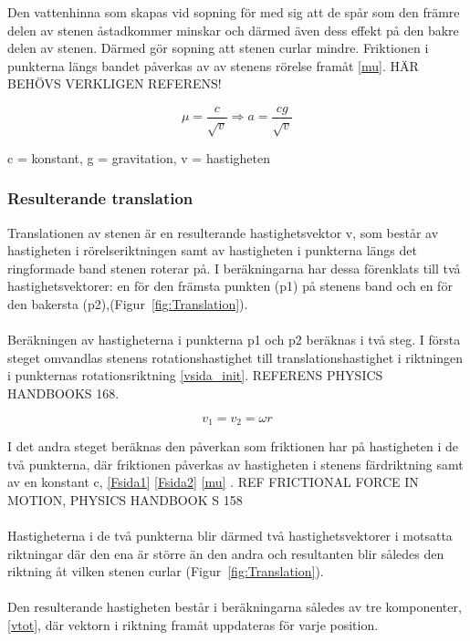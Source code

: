 \documentclass[11pt]{article} %
\begin{document}
Den vattenhinna som skapas vid sopning för med sig att de spår som den främre delen av stenen åstadkommer minskar och därmed  även dess effekt på den bakre delen av stenen. Därmed gör sopning att stenen curlar mindre. Friktionen i punkterna längs bandet påverkas av av stenens rörelse framåt \eqref{mu}. HÄR BEHÖVS VERKLIGEN REFERENS!     

\begin{equation}\label{mu} 
\mu = \frac{c}{\sqrt{v}} \Rightarrow a = \frac{cg}{\sqrt{v}} 
\end{equation}

c = konstant, g = gravitation, v = hastigheten

\subsubsection{Resulterande translation}

Translationen av stenen är en resulterande hastighetsvektor v, som består av hastigheten i rörelseriktningen samt av hastigheten i punkterna längs det ringformade band stenen roterar på. I beräkningarna har dessa förenklats till två hastighetsvektorer: en för den främsta punkten (p1)  på stenens band och en för den bakersta (p2),(Figur~\ref{fig:Translation}). 
\\\\Beräkningen av hastigheterna i punkterna p1 och p2 beräknas i två steg. I första steget omvandlas stenens rotationshastighet till translationshastighet i riktningen i punkternas rotationsriktning \eqref{vsida_init}. REFERENS PHYSICS HANDBOOKS 168.
 
\begin{equation}\label{vsida_init}
 v_1 = v_2 = \omega r
 \end{equation}

I det andra steget beräknas den påverkan som friktionen har på hastigheten i de två punkterna, där friktionen påverkas av hastigheten i stenens färdriktning samt av en konstant c,  \eqref{Fsida1} \eqref{Fsida2} \eqref{mu} . 
REF FRICTIONAL FORCE IN MOTION, PHYSICS HANDBOOK S 158
\\\\Hastigheterna i de två punkterna blir därmed två hastighetsvektorer i motsatta riktningar där den ena är större än den andra och resultanten blir således den riktning åt vilken stenen curlar (Figur~\ref{fig:Translation}). 
\\\\Den resulterande hastigheten består i beräkningarna således av tre komponenter, \eqref{vtot}, där vektorn i riktning framåt uppdateras för varje position. 
\end{document}
